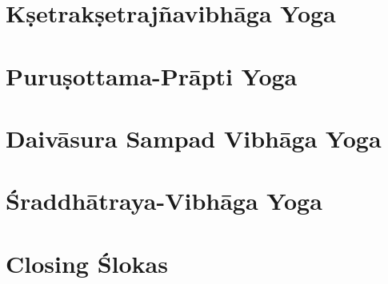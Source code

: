 \documentclass{scrbook}
\begin{document}
\chapter{Kṣetrakṣetrajñavibhāga Yoga}
\begin{multicols}{2}
    
\end{multicols}

\setcounter{chapter}{14}

\chapter{Puruṣottama-Prāpti Yoga}
\begin{multicols}{2}
    
\end{multicols}

\chapter{Daivāsura Sampad Vibhāga Yoga}
\begin{multicols}{2}
    
\end{multicols}

\chapter{Śraddhātraya-Vibhāga Yoga}
\begin{multicols}{2}
    
\end{multicols}

\backmatter
\chapter{Closing Ślokas}

\end{document}

